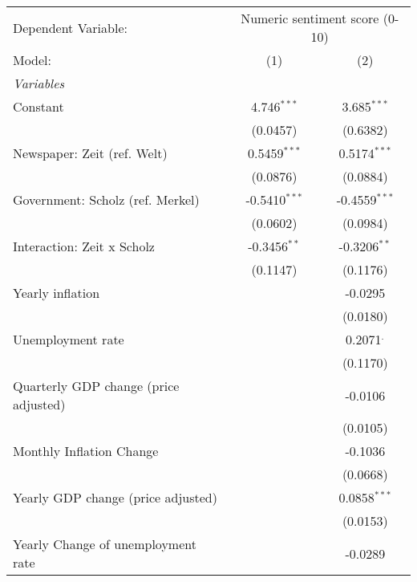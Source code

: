 
\begingroup
\centering
\begin{tabular}{lcc}
   \tabularnewline \midrule \midrule
   Dependent Variable: & \multicolumn{2}{c}{Numeric sentiment score (0-10)}\\
   Model:                                & (1)             & (2)\\  
   \midrule
   \emph{Variables}\\
   Constant                              & 4.746$^{***}$   & 3.685$^{***}$\\   
                                         & (0.0457)        & (0.6382)\\   
   Newspaper: Zeit (ref. Welt)           & 0.5459$^{***}$  & 0.5174$^{***}$\\   
                                         & (0.0876)        & (0.0884)\\   
   Government: Scholz (ref. Merkel)      & -0.5410$^{***}$ & -0.4559$^{***}$\\   
                                         & (0.0602)        & (0.0984)\\   
   Interaction: Zeit x Scholz            & -0.3456$^{**}$  & -0.3206$^{**}$\\   
                                         & (0.1147)        & (0.1176)\\   
   Yearly inflation                      &                 & -0.0295\\   
                                         &                 & (0.0180)\\   
   Unemployment rate                     &                 & 0.2071$^{.}$\\   
                                         &                 & (0.1170)\\   
   Quarterly GDP change (price adjusted) &                 & -0.0106\\   
                                         &                 & (0.0105)\\   
   Monthly Inflation Change              &                 & -0.1036\\   
                                         &                 & (0.0668)\\   
   Yearly GDP change (price adjusted)    &                 & 0.0858$^{***}$\\   
                                         &                 & (0.0153)\\   
   Yearly Change of unemployment rate    &                 & -0.0289\\   

\end{tabular}
